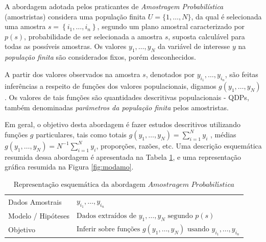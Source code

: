 \documentclass[
  12pt,
  brazilian,
]{book}
\theoremstyle{definition}
\theoremstyle{definition}
\theoremstyle{definition}
\theoremstyle{definition}
\theoremstyle{remark}
\begin{document}
A abordagem adotada pelos praticantes de \emph{Amostragem Probabilística}
(amostristas) considera uma população finita \(U=\{1, \ldots ,N\}\), da qual é
selecionada uma amostra \(s=\left\{ i_{1}, \ldots ,i_{n}\right\}\), segundo um
plano amostral caracterizado por \(p(s)\), probabilidade de ser
selecionada a amostra \(s\), suposta calculável para todas as possíveis amostras.
Os valores \(y_{1}, \ldots ,y_{N}\) da variável de interesse \(y\) na \emph{população finita} são considerados fixos, porém desconhecidos.

A partir dos valores observados na amostra \(s\), denotados por \(y_{i_1}, \ldots, y_{i_n}\), são feitas inferências a respeito de funções dos valores populacionais, digamos \(g\left( y_{1}, \ldots , y_{N}\right)\). Os valores de tais funções são quantidades descritivas populacionais - QDPs, também denominadas \emph{parâmetros da população finita} pelos amostristas.

Em geral, o objetivo desta abordagem é fazer estudos descritivos utilizando funções \(g\) particulares, tais como totais \(g\left( y_{1}, \ldots , y_{N}\right) = \sum_{i=1}^{N} y_{i}\) , médias \(g\left( y_{1}, \ldots , y_{N}\right) = N^{-1}\sum_{i=1}^{N} y_{i}\), proporções, razões, etc. Uma descrição esquemática resumida dessa abordagem é apresentada na Tabela \ref{tab:modelamo}, e uma representação gráfica resumida na Figura \ref{fig:modamo}.

\begin{table}[H]

\caption{\label{tab:modelamo}$\text{Representação esquemática da abordagem }\textit{Amostragem Probabilística}$}
\centering
\begin{tabular}[t]{>{\raggedright\arraybackslash}p{4.5cm}l}
\toprule
Dados Amostrais & $y_{i_1}, \ldots, y_{i_n}$\\
Modelo / Hipóteses & $\text{Dados extraídos de }y_1,\ldots, y_N \text{ segundo }p(s)$\\
Objetivo & $\text{Inferir sobre funções }g(y_1, \ldots , y_N)\text{ usando }y_{i_1}, \ldots, y_{i_n}$\\
\bottomrule
\end{tabular}
\end{table}
\end{document}
